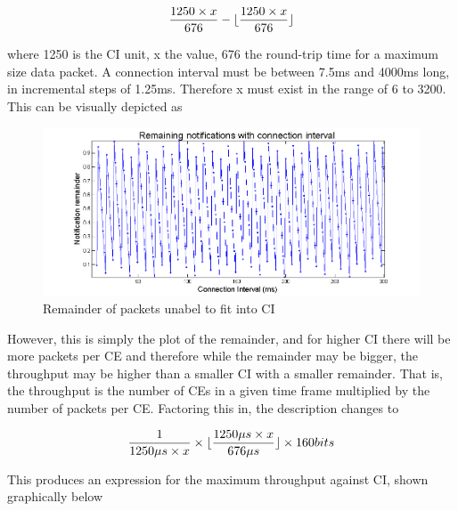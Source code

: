 \documentclass[]{article}
\DeclarePairedDelimiter\floor{\lfloor}{\rfloor}
\begin{document}
\begin{displaymath}
 \frac{1250\times x}{676}  - \floor{ \frac{1250\times x}{676}}
\end{displaymath}

where 1250 is the \ac{CI} unit, x the value, 676 the round-trip time for a maximum size data packet. A connection interval must be between 7.5ms and 4000ms long, in incremental steps of 1.25ms. Therefore x must exist in the range of 6 to 3200. This can be visually depicted as

\begin{figure}[H]
	\begin{center}
		\includegraphics[width = \textwidth]{notremain}
	\end{center}
	\caption{Remainder of packets unabel to fit into \ac{CI}}
	\label{fig:notremain}
\end{figure}

However, this is simply the plot of the remainder, and for higher \ac{CI} there will be more packets per \ac{CE} and therefore while the remainder may be bigger, the throughput may be higher than a smaller \ac{CI} with a smaller remainder. That is, the throughput is the number of \ac{CE}s in a given time frame multiplied by the number of packets per \ac{CE}. Factoring this in, the description changes to

\begin{displaymath}
 \frac{1}{1250 \mu s \times x} \times \floor{ \frac{1250 \mu s\times x}{676 \mu s}} \times 160 bits 
\end{displaymath}

This produces an expression for the maximum throughput against \ac{CI}, shown graphically below
\end{document}
